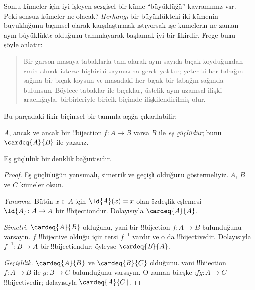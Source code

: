 



Sonlu kümeler için iyi işleyen sezgisel bir küme ``büyüklüğü'' kavramımız
var. Peki sonsuz kümeler ne olacak? \emph{Herhangi} bir büyüklükteki iki
kümenin büyüklüğünü biçimsel olarak karşılaştırmak istiyorsak işe kümelerin
ne zaman aynı büyüklükte olduğunu tanımlayarak başlamak iyi bir fikirdir.
Frege bunu şöyle anlatır:
\begin{quote}
  Bir garson masaya tabaklarla tam olarak aynı sayıda bıçak koyduğundan emin
  olmak isterse hiçbirini saymasına gerek yoktur; yeter ki her tabağın sağına
  bir bıçak koysun ve masadaki her bıçak bir tabağın sağında bulunsun. Böylece
  tabaklar ile bıçaklar, üstelik aynı uzamsal ilişki aracılığıyla, birbirleriyle
  biricik biçimde ilişkilendirilmiş olur. \citep[\S70]{Frege1884}
\end{quote}
Bu parçadaki fikir biçimsel bir tanımla açığa çıkarılabilir:

\begin{defn}
  $A$, ancak ve ancak bir !!{bijection} $f\colon A\to B$ varsa $B$ ile
  \emph{eş güçlüdür}; bunu $\cardeq{A}{B}$ ile yazarız.
\end{defn}

\begin{prop}
Eş güçlülük bir denklik bağıntısıdır.
\end{prop}

\begin{proof}
Eş güçlülüğün yansımalı, simetrik ve geçişli olduğunu göstermeliyiz. $A$,
$B$ ve $C$ kümeler olsun.

\emph{Yansıma.} Bütün $x\in A$ için $\Id{A}(x)=x$ olan özdeşlik eşlemesi
$\Id{A}\colon A\to A$ bir !!{bijection}{}dur. Dolayısıyla $\cardeq{A}{A}$.

\emph{Simetri.} $\cardeq{A}{B}$ olduğunu, yani bir !!{bijection}
$f\colon A\to B$ bulunduğunu varsayın. $f$ !!{bijective} olduğu için tersi
$f^{-1}$ vardır ve o da !!{bijective}{}dir. Dolayısıyla $f^{-1}\colon B\to A$
bir !!{bijection}{}dur; öyleyse $\cardeq{B}{A}$.

\emph{Geçişlilik.} $\cardeq{A}{B}$ ve $\cardeq{B}{C}$ olduğunu, yani
!!{bijection} $f\colon A\to B$ ile $g\colon B\to C$ bulunduğunu varsayın.
O zaman bileşke $\comp{f}{g}\colon A\to C$ !!{bijective}{}dir; dolayısıyla
$\cardeq{A}{C}$.
\end{proof}

